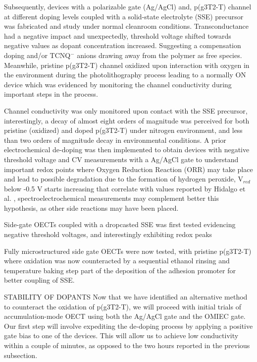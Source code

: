 Subsequently, devices with a polarizable gate (Ag/AgCl) and, p(g3T2-T) channel at different doping levels coupled with a solid-state electrolyte (SSE) precursor was fabricated and study under normal cleanroom conditions. Transconductance had a negative impact and unexpectedly, threshold voltage shifted towards negative values as dopant concentration increased. Suggesting a compensation doping and/or TCNQ$^{-}$ anions drawing away from the polymer as free species. Meanwhile, pristine p(g3T2-T) channel oxidized upon interaction with oxygen in the environment during the photolithography process leading to a normally ON device which was evidenced by monitoring the channel conductivity during important steps in the process.

Channel conductivity was only monitored upon contact with the SSE precursor, interestingly, a decay of almost eight orders of magnitude was perceived for both pristine (oxidized) and doped p(g3T2-T) under nitrogen environment, and less than two orders of magnitude decay in environmental conditions. A prior electrochemical de-doping was then implemented to obtain devices with negative threshold voltage and CV measurements with a Ag/AgCl gate to understand important redox points where Oxygen Reduction Reaction (ORR) may take place and lead to possible degradation due to the formation of hydrogen peroxide, V$_{red}$ below -0.5 V starts increasing that correlate with values reported by Hidalgo et al. \cite{hidalgocastilloSimultaneousPerformanceStability2022a} , spectroelectrochemical measurements may complement better this hypothesis, as other side reactions may have been placed.

Side-gate OECTs coupled with a dropcasted SSE was first tested evidencing negative threshold voltages, and interestingly exhibiting redox peaks

Fully microstructured side gate OECTs were now tested, with pristine p(g3T2-T) where oxidation was now counteracted by a sequential ethanol rinsing and temperature baking step part of the deposition of the adhesion promoter for better coupling of SSE. 

STABILITY OF DOPANTS
Now that we have identified an alternative method to counteract the oxidation of p(g3T2-T), we will proceed with initial trials of accumulation-mode OECT using both the Ag/AgCl gate and the OMIEC gate. Our first step will involve expediting the de-doping process by applying a positive gate bias to one of the devices. This will allow us to achieve low conductivity within a couple of minutes, as opposed to the two hours reported in the previous subsection. 

